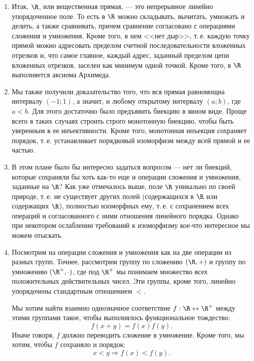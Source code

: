 \begin{enumerate}
\item Итак, $\R$, или вещественная прямая, --- это непрерывное линейно упорядоченное поле. То есть в $\R$ можно складывать, вычитать, умножать и делить, а также сравнивать, причем сравнение согласовано с операциями сложения и умножения. Кроме того, в нем <<нет дыр>>, т.\,е. каждую точку прямой можно адресовать пределом счетной последовательности вложенных отрезков и, что самое главное, каждый адрес, заданный пределом цепи вложенных отрезков, заселен как минимум одной точкой. Кроме того, в $\R$ выполняется аксиома Архимеда.

\item Мы также получили доказательство того, что вся прямая равномощна интервалу $(-1;1)$, а значит, и любому открытому интервалу $(a;b)$, где $a<b$. Для этого достаточно было предъявить биекцию в явном виде. Проще всего в таких случаях строить строго монотонную биекцию, чтобы быть уверенным в ее инъективности. Кроме того, монотонная инъекция сохраняет порядок, т.\,е. устанавливает порядковый изоморфизм между всей прямой и ее частью.

\item В этом плане было бы интересно задаться вопросом --- нет ли биекций, которые сохраняли бы хоть как-то еще и операции сложения и умножения, заданные на $\R$? Как уже отмечалось выше, поле $\R$ уникально по своей природе, т.\,е. не существует других полей (содержащихся в $\R$ или содержащих $\R$), полностью изоморфных ему, т.\,е. с сохранением всех операций и согласованного с ними отношения линейного порядка. Однако при некотором ослаблении требований к изоморфизму кое-что интересное мы можем отыскать.

\item Посмотрим на операции сложения и умножения как на две операции из разных групп. Точнее, рассмотрим группу по сложению $(\R,+)$ и группу по умножению $(\R^+,\cdot)$, где под $\R^+$ мы понимаем множество всех положительных действительных чисел. Эти группы, кроме того, линейно упорядочены стандартным отношением $<$.

Мы хотим найти взаимно однозначное соответствие $f:\R\leftrightarrow\R^+$ между этими группами такое, чтобы выполнялось функциональное тождество:
\begin{equation}\label{plusmult}
f(x+y)=f(x)f(y).
\end{equation}
Иначе говоря, $f$ должно переводить сложение в умножение. Кроме того, мы хотим, чтобы $f$ сохраняло и порядок:
\begin{equation}\label{porad}
x<y\Rightarrow f(x)<f(y).
\end{equation}


\end{enumerate}
